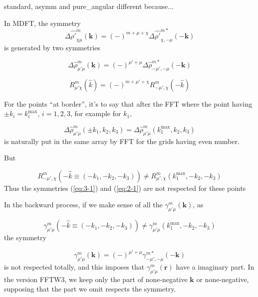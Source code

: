 standard, asymm and pure\_angular different because...

In MDFT, the symmetry 
\begin{equation}
\Delta\hat{\rho'}_{\chi\mu}^{m}(\mathbf{k})=(-)^{m+\mu+\chi}\Delta\hat{\rho'}_{\chi,-\mu}^{m*}(-\mathbf{k})\label{eq:2-1}
\end{equation}
 is generated by two symmetries

\begin{equation}
\Delta\hat{\rho}_{\mu'\mu}^{m}(\mathbf{k})=(-)^{\mu'+\mu}\Delta\hat{\rho}_{-\mu',-\mu}^{m*}(-\mathbf{k})\label{eq:1-1}
\end{equation}


\begin{equation}
R_{\mu'\chi}^{m}(\hat{k})=(-)^{m+\mu'+\chi}R_{-\mu',\chi}^{m}(-\hat{k})\label{eq:3-1}
\end{equation}


For the points ``at border'', it's to say that after the FFT where
the point having $\pm k_{i}=k_{i}^{\mathrm{max}}$, $i=1,2,3$, for
example for $k_{1},$

\[
\Delta\hat{\rho}_{\mu'\mu}^{m}(\pm k_{1},k_{2},k_{3})=\Delta\hat{\rho}_{\mu'\mu}^{m}(k_{1}^{\mathrm{max}},k_{2},k_{3})
\]
is naturally put in the same array by FFT for the grids having even
number. 

But

\[
R_{-\mu',\chi}^{m}(-\hat{k}\equiv(-k_{1},-k_{2},-k_{3}))\neq R_{\mu',\chi}^{m}(k_{1}^{\mathrm{max}},-k_{2},-k_{3})
\]
Thus the symmetries (\ref{eq:3-1}) and (\ref{eq:2-1}) are not respected
for these points 

In the backward process, if we make sense of all the $\gamma_{\mu'\mu}^{m}(\mathbf{k})$,
as

\[
\gamma_{\mu'\mu}^{m}(-\hat{k}\equiv(-k_{1},-k_{2},-k_{3}))\neq\gamma_{\mu'\mu}^{m}(k_{1}^{\mathrm{max}},-k_{2},-k_{3})
\]
the symmetry

\begin{equation}
\gamma_{\mu'\mu}^{m}(\mathbf{k})=(-)^{\mu'+\mu}\gamma_{-\mu',-\mu}^{m*}(-\mathbf{k})\label{eq:1-1}
\end{equation}
is not respected totally, and this imposes that $\gamma_{\mu'\mu}^{m}(\mathbf{r})$
have a imaginary part. In the version FFTW3, we keep only the part
of none-negative $\mathbf{k}$ or none-negative, supposing that the
part we omit respects the symmetry.

